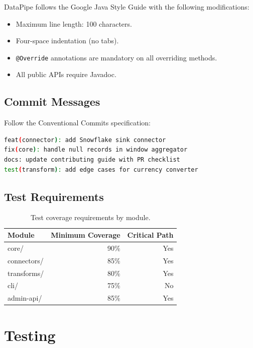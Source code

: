\documentclass[
    language=english,
    doctype=manual,
    institution=none,
    titlestyle=book,
    oneside,
]{../../omnilatex}
\begin{document}
DataPipe follows the Google Java Style Guide with the following
modifications:

\begin{itemize}
    \item Maximum line length: 100 characters.
    \item Four-space indentation (no tabs).
    \item \texttt{@Override} annotations are mandatory on all
        overriding methods.
    \item All public APIs require Javadoc.
\end{itemize}

\section{Commit Messages}

Follow the Conventional Commits specification:

\begin{lstlisting}[language=bash, caption={Commit message examples.}]
feat(connector): add Snowflake sink connector
fix(core): handle null records in window aggregator
docs: update contributing guide with PR checklist
test(transform): add edge cases for currency converter
\end{lstlisting}

\section{Test Requirements}

\begin{table}[htbp]
    \centering
    \caption{Test coverage requirements by module.}
    \label{tab:test-coverage}
    \begin{tabular}{@{}lrr@{}}
        \toprule
        Module & Minimum Coverage & Critical Path \\
        \midrule
        core/ & 90\% & Yes \\
        connectors/ & 85\% & Yes \\
        transforms/ & 80\% & Yes \\
        cli/ & 75\% & No \\
        admin-api/ & 85\% & Yes \\
        \bottomrule
    \end{tabular}
\end{table}

\chapter{Testing}
\label{sec:testing}
\end{document}
